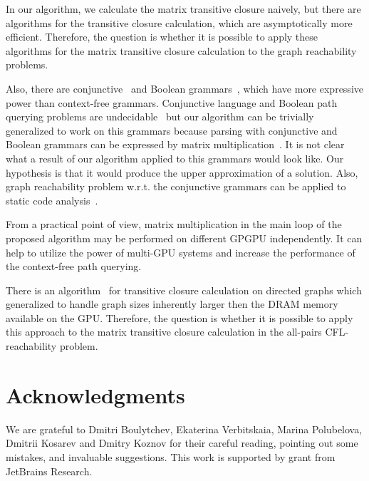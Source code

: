\documentclass[runningheads,a4paper]{llncs}
\begin{document}
In our algorithm, we calculate the matrix transitive closure naively, but there are algorithms for the transitive closure calculation, which are asymptotically more efficient. Therefore, the question is whether it is possible to apply these algorithms for the matrix transitive closure calculation to the graph reachability problems.

Also, there are conjunctive~\cite{okhotinConjAndBool} and Boolean grammars~\cite{okhotinBoolean}, which have more expressive power than context-free grammars. Conjunctive language and Boolean path querying problems are undecidable~\cite{hellingsRelational} but our algorithm can be trivially generalized to work on this grammars because parsing with conjunctive and Boolean grammars can be expressed by matrix multiplication~\cite{okhotin_cyk}. It is not clear what a result of our algorithm applied to this grammars would look like. Our hypothesis is that it would produce the upper approximation of a solution. Also, graph reachability problem w.r.t. the conjunctive grammars can be applied to static code analysis~\cite{zhang2017context}.

From a practical point of view, matrix multiplication in the main loop of the proposed algorithm may be performed on different GPGPU independently. It can help to utilize the power of multi-GPU systems and increase the performance of the context-free path querying.

There is an algorithm~\cite{apspGPU} for transitive closure calculation on directed graphs which generalized to handle graph sizes inherently larger then the DRAM memory available on the GPU. Therefore, the question is whether it is possible to apply this approach to the matrix transitive closure calculation in the all-pairs CFL-reachability problem.

\section*{Acknowledgments}%

We are grateful to Dmitri Boulytchev, Ekaterina Verbitskaia, Marina Polubelova, Dmitrii Kosarev and Dmitry Koznov for their careful reading, pointing out some mistakes, and invaluable suggestions.
This work is supported by grant from JetBrains Research.




\end{document}
